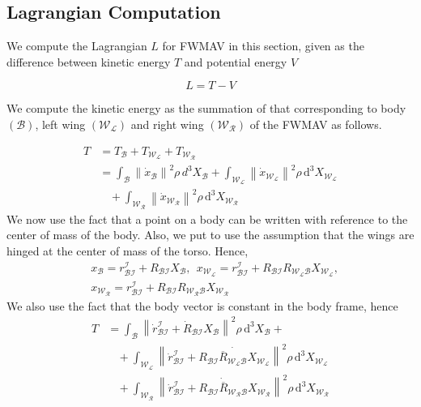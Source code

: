 \documentclass[letterpaper, 10 pt, conference]{ieeeconf}  \newcommand{\RN}[1]{\textup{\uppercase\expandafter{\romannumeral#1}}}
\newcommand{\norm}[1]{\left\lVert{#1}\right\rVert}
\begin{document}
\subsection{Lagrangian Computation}

We compute the Lagrangian $L$ for FWMAV in this section, given as the difference between kinetic energy $T$ and potential energy $V$

\begin{equation}\label{lagrangian}
L=T-V
\end{equation}

We compute the kinetic energy as the summation of that corresponding to body $(\mathcal{B})$, left wing $(\mathcal{W_L})$ and right wing $(\mathcal{W_R})$ of the FWMAV as follows.

\begin{align}
T&=T_\mathcal{B}+T_\mathcal{\mathcal{W_L}}+T_\mathcal{\mathcal{W_R}} \nonumber \\
&=\int_\mathcal{B} \norm{\dot{x}_\mathcal{B}}^2\rho \, d^3X_{\mathcal{B}} + \int_\mathcal{W_L} \norm{\dot{x}_\mathcal{W_L}}^2\rho \,  \mathrm d^3X_{\mathcal{W_L}} \nonumber \\ & \:\:\:\: + \int_\mathcal{W_R} \norm{\dot{x}_\mathcal{W_R}}^2\rho \, \mathrm d^3X_{\mathcal{W_R}} \nonumber
\end{align}
We now use the fact that a point on a body can be written with reference to the center of mass of the body. Also, we put to use the assumption that the wings are hinged at the center of mass of the torso. Hence,
\begin{align*}
&x_\mathcal{B}=r_\mathcal{BI}^{\mathcal{I}}+R_\mathcal{BI}X_{\mathcal{B}},~ \: x_\mathcal{W_L}=r_\mathcal{BI}^{\mathcal{I}}+R_\mathcal{BI}R_\mathcal{W_L B}X_{\mathcal{W_L}} ,\\
& x_\mathcal{W_R}=r_\mathcal{BI}^{\mathcal{I}}+R_\mathcal{BI}R_\mathcal{W_R B}X_{\mathcal{W_R}}
\end{align*}
We also use the fact that the body vector is constant in the body frame, hence
\begin{align}
T&=\int_\mathcal{B} \norm{\dot{r}_\mathcal{BI}^{\mathcal{I}}+\dot{R}_\mathcal{BI}X_{\mathcal{B}}}^2\rho \, \mathrm d^3X_{\mathcal{B}} + \nonumber
\\ & \:\:\:\: +\int_\mathcal{W_L} \norm{\dot{r}_\mathcal{BI}^{\mathcal{I}}+\dot{\overline{R_\mathcal{BI}R_\mathcal{W_L B}}X_\mathcal{W_L}}}^2\rho \, \mathrm d^3X_{\mathcal{W_L}} \nonumber
\\ & \:\:\:\: + \int_\mathcal{W_R} \norm{\dot{r}_\mathcal{BI}^{\mathcal{I}}+\dot{\overline{R_\mathcal{BI} R_\mathcal{W_R B}}}X_\mathcal{W_R}}^2\rho \, \mathrm d^3X_{\mathcal{W_R}} \label{kinetic}
\end{align}
\end{document}
